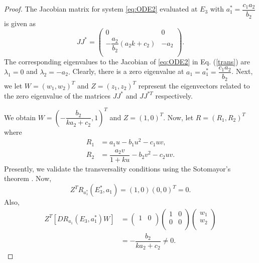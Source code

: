 \documentclass[10pt]{amsart}
\theoremstyle{definition}
\begin{document}
\begin{proof}
The Jacobian matrix for system \eqref{eq:ODE2} evaluated at $E_3$ with $a_1^*=\dfrac{c_1a_2}{b_2}$ is given as 
\begin{equation}\label{trans}
JJ^*=
\left(
\begin{array}{cc}
     0& 0 \\
 -\dfrac{a_2}{b_2} \left(a_2 k+c_2\right) & -a_2 \\
\end{array}
\right).
\end{equation}
The corresponding eigenvalues to the Jacobian of  \eqref{eq:ODE2} in Eq. (\ref{trans}) are $\lambda_1=0$ and $\lambda_2=-a_2.$ Clearly, there is a zero eigenvalue at  $a_1=a_1^*=\dfrac{c_1a_2}{b_2}$. Next, we let $W=(w_1,w_2)^T$ and $Z=(z_1,z_2)^T$ represent the eigenvectors  related to the zero eigenvalue of the matrices $JJ^{*}$ and $JJ^{*T}$ respectively.

We obtain $W=\left(-\dfrac{b_2}{ka_2+c_2},1 \right)^T$ and $Z=\left(1,0 \right)^T$.  Now, let $R=(R_1,R_2)^T$ where 
	\begin{equation*}
		\begin{split}
			R_1&= a_1u-b_1 u^2-c_1uv,\\
			R_2&= \dfrac{a_2 v}{1+ku}-b_2v^2-c_2 uv.
		\end{split}
	\end{equation*}
	Presently, we validate the transversality conditions using the Sotomayor's theorem \cite{perko2013differential}. Now,
	$$Z^TR_{a_1^*}(E_3^*,a_1)=\left(1,0 \right) \left(0,0 \right)^T= 0.$$
	Also,
	\begin{align*}
Z^{T}\left[DR_{a_1}\left(E_3,a_1^* \right)W\right] &= \left(
\begin{array}{cc}
 1 & 0 \\
\end{array}
\right) 
\left(
\begin{array}{ccc}
 1& 0  \\
  0 & 0 \\
\end{array}
\right)
\left(
\begin{array}{ccc}
 w_1 \\
  w_2 \\
\end{array}
\right) \\
&=-\dfrac{b_2}{ka_2+c_2}\neq 0.
\end{align*}


\end{proof}
\end{document}
